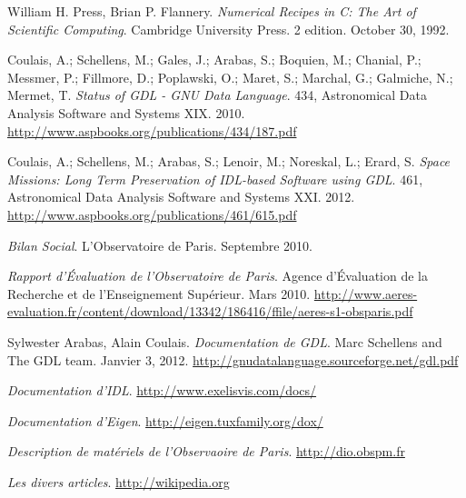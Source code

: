 
\begin{thebibliography}{ABC}	
    
       William H. Press, Brian P. Flannery.
      \emph{Numerical Recipes in C: The Art of Scientific Computing}.
      Cambridge University Press.
      2 edition.
      October 30, 1992.
    
       Coulais, A.; Schellens, M.; Gales, J.; Arabas, S.; Boquien, M.; Chanial, P.; Messmer, P.; Fillmore, D.; Poplawski, O.; Maret, S.; Marchal, G.; Galmiche, N.; Mermet, T.
       \emph{Status of GDL - GNU Data Language}.
       434, Astronomical Data Analysis Software and Systems XIX.
       2010.
       \url{http://www.aspbooks.org/publications/434/187.pdf}
    
       Coulais, A.; Schellens, M.; Arabas, S.; Lenoir, M.; Noreskal, L.; Erard, S.
       \emph{Space Missions: Long Term Preservation of IDL-based Software using GDL}.
       461, Astronomical Data Analysis Software and Systems XXI.
       2012.
       \url{http://www.aspbooks.org/publications/461/615.pdf}
    
       \emph{Bilan Social}.
       L'Observatoire de Paris.
       Septembre 2010.
    
       \emph{Rapport d’Évaluation de l’Observatoire de Paris}.
       Agence d’Évaluation de la Recherche et de l'Enseignement Supérieur.
       Mars 2010.
       \url{http://www.aeres-evaluation.fr/content/download/13342/186416/ffile/aeres-s1-obsparis.pdf}
    
       Sylwester Arabas, Alain Coulais.
       \emph{Documentation de GDL}.
       Marc Schellens and The GDL team.
       Janvier 3, 2012.
       \url{http://gnudatalanguage.sourceforge.net/gdl.pdf}
    
       \emph{Documentation d'IDL}.
       \url{http://www.exelisvis.com/docs/}
    
       \emph{Documentation d'Eigen}.
       \url{http://eigen.tuxfamily.org/dox/}
    
       \emph{Description de matériels de l'Observaoire de Paris}.
       \url{http://dio.obspm.fr}
    
       \emph{Les divers articles}.
       \url{http://wikipedia.org}
    
\end{thebibliography}
